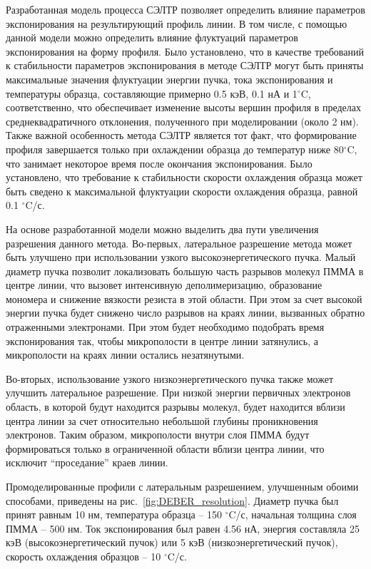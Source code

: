 Разработанная модель процесса СЭЛТР позволяет определить влияние параметров экспонирования на результирующий профиль линии. В том числе, с помощью данной модели можно определить влияние флуктуаций параметров экспонирования на форму профиля.
Было установлено, что в качестве требований к стабильности параметров экспонирования в методе СЭЛТР могут быть приняты максимальные значения флуктуации энергии пучка, тока экспонирования и температуры образца, составляющие примерно 0.5 кэВ, 0.1 нА и 1$^\circ$C, соответственно, что обеспечивает изменение высоты вершин профиля в пределах среднеквадратичного отклонения, полученного при моделировании (около 2 нм). Также важной особенность метода СЭЛТР является тот факт, что формирование профиля завершается только при охлаждении образца до температур ниже 80$^\circ$C, что занимает некоторое время после окончания экспонирования. Было установлено, что требование к стабильности скорости охлаждения образца может быть сведено к максимальной флуктуации скорости охлаждения образца, равной 0.1 $^\circ$C/с.

На основе разработанной модели можно выделить два пути увеличения разрешения данного метода. Во-первых, латеральное разрешение метода может быть улучшено при использовании узкого высокоэнергетического пучка. Малый диаметр пучка позволит локализовать большую часть разрывов молекул ПММА в центре линии, что вызовет интенсивную деполимеризацию, образование мономера и снижение вязкости резиста в этой области. При этом за счет высокой энергии пучка будет снижено число разрывов на краях линии, вызванных обратно отраженными электронами. При этом будет необходимо подобрать время экспонирования так, чтобы микрополости в центре линии затянулись, а микрополости на краях линии остались незатянутыми.

Во-вторых, использование узкого низкоэнергетического пучка также может улучшить латеральное разрешение. При низкой энергии первичных электронов область, в которой будут находится разрывы молекул, будет находится вблизи центра линии за счет относительно небольшой глубины проникновения электронов. Таким образом, микрополости внутри слоя ПММА будут формироваться только в ограниченной области вблизи центра линии, что исключит ``проседание'' краев линии.

Промоделированные профили с латеральным разрешением, улучшенным обоими способами, приведены на рис.~\ref{fig:DEBER_resolution}. Диаметр пучка был принят равным 10 нм, температура образца -- 150 $^\circ$C/с, начальная толщина слоя ПММА -- 500 нм. Ток экспонирования был равен 4.56 нА, энергия составляла 25 кэВ (высокоэнергетический пучок) или 5 кэВ (низкоэнергетический пучок), скорость охлаждения образцов -- 10 $^\circ$C/с.

